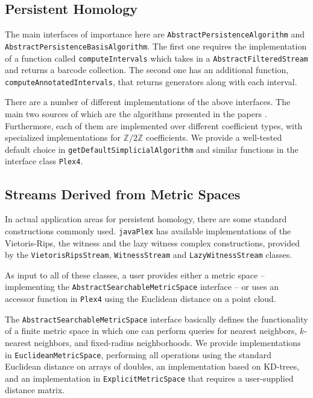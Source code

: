 \documentclass[11pt]{amsart}
\newcommand\javaPlex{\texttt{javaPlex}\xspace}
\begin{document}
\subsection{Persistent Homology}

The main interfaces of importance here are  \texttt{Abstract\-Persistence\-Algorithm} and  \texttt{Abstract\-Persistence\-Basis\-Algorithm}. The first one requires the implementation of a function called  \texttt{computeIntervals} which takes in a  \texttt{AbstractFilteredStream} and returns a barcode collection. The second one has an additional function,  \texttt{computeAnnotatedIntervals}, that returns generators along with each interval.

There are a number of different implementations of the above interfaces. The main two sources of which are the algorithms presented in the papers \cite{Carlsson_04, Dualities}. Furthermore, each of them are implemented over different coefficient types, with specialized implementations for $\mathbb{Z}/2\mathbb{Z}$ coefficients. We provide a well-tested default choice in \texttt{getDefaultSimplicialAlgorithm} and similar functions in the interface class \texttt{Plex4}.

\subsection{Streams Derived from Metric Spaces}

In actual application areas for persistent homology, there are some standard constructions commonly used. \javaPlex has available implementations of the Vietoris-Rips, the witness and the lazy witness complex constructions, provided by the  \texttt{VietorisRipsStream},  \texttt{WitnessStream} and  \texttt{LazyWitnessStream} classes. 

As input to all of these classes, a user provides either a metric space -- implementing the \texttt{Abstract\-Searchable\-Metric\-Space} interface -- or uses an accessor function in \texttt{Plex4} using the Euclidean distance on a point cloud.

The  \texttt{Abstract\-Searchable\-Metric\-Space} interface basically defines the functionality of a finite metric space in which one can perform queries for nearest neighbors, $k$-nearest neighbors, and fixed-radius neighborhoods. We provide implementations in \texttt{EuclideanMetricSpace}, performing all operations using the standard Euclidean distance on arrays of doubles, an implementation based on KD-trees, and an implementation in \texttt{ExplicitMetricSpace} that requires a user-supplied distance matrix. 
\end{document}
